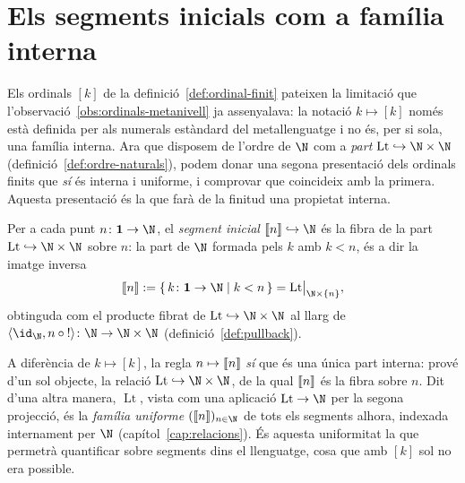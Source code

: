 \section{Els segments inicials com a família interna}\label{sec:segments-interns}

Els ordinals \([k]\) de la definició~\ref{def:ordinal-finit} pateixen la
limitació que l'observació~\ref{obs:ordinals-metanivell} ja assenyalava:
la notació \(k\mapsto[k]\) només està definida per als numerals estàndard
del metallenguatge i no és, per si sola, una família interna. Ara que
disposem de l'ordre de
\(\N\) com a \emph{part} \(\operatorname{Lt}\hookrightarrow\N\times\N\)
(definició~\ref{def:ordre-naturals}), podem donar una segona presentació
dels ordinals finits que \emph{sí} és interna i uniforme, i comprovar que
coincideix amb la primera. Aquesta presentació és la que farà de la
finitud una propietat interna.

\begin{definicio}\label{def:segment-inicial}
Per a cada punt \(n\colon\mathbf1\to\N\), el \emph{segment inicial}
\(\seg{n}\hookrightarrow\N\) és la fibra de la part
\(\operatorname{Lt}\hookrightarrow\N\times\N\) sobre \(n\): la part de
\(\N\) formada pels \(k\) amb \(k<n\), és a dir la imatge inversa
\[
\seg{n}:=\{\,k\colon\mathbf1\to\N \mid k<n\,\}
=\operatorname{Lt}\bigl|_{\N\times\{n\}} ,
\]
obtinguda com el producte fibrat de \(\operatorname{Lt}\hookrightarrow
\N\times\N\) al llarg de \(\langle\id_\N,n\circ{!}\rangle\colon\N\to
\N\times\N\) (definició~\ref{def:pullback}).
\end{definicio}

\begin{observacio}\label{obs:segments-interns}
A diferència de \(k\mapsto[k]\), la regla \(n\mapsto\llbracket n\rrbracket\) \emph{sí} que és una única part interna: prové d'un sol
objecte, la relació \(\operatorname{Lt}\hookrightarrow\N\times\N\), de la
qual \(\llbracket n\rrbracket\) és la fibra sobre \(n\). Dit d'una altra
manera, \(\operatorname{Lt}\), vista com una aplicació
\(\operatorname{Lt}\to\N\) per la segona projecció, és la
\emph{família uniforme} \((\seg{n})_{n\in\N}\) de tots els
segments alhora, indexada internament per \(\N\)
(capítol~\ref{cap:relacions}). És aquesta uniformitat la que permetrà
quantificar sobre segments dins el llenguatge, cosa que amb \([k]\) sol no
era possible.
\end{observacio}

